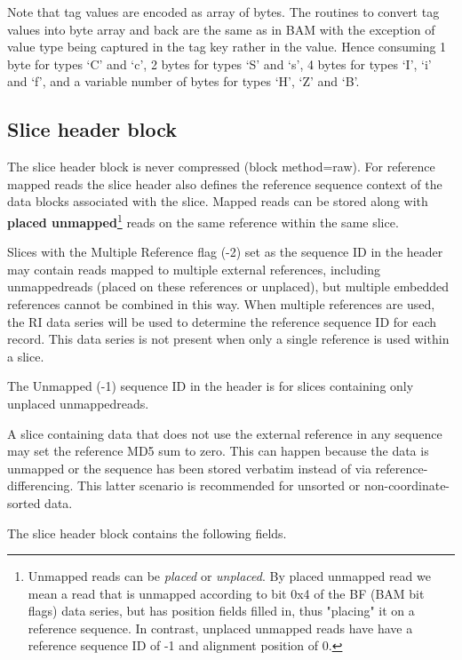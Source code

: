 \documentclass[a4paper]{article}
\begin{document}
Note that tag values are encoded as array of bytes. The routines to convert tag 
values into byte array and back are the same as in BAM with the exception of value 
type being captured in the tag key rather in the value.
Hence consuming 1 byte for types `C' and `c', 2 bytes for types `S' and `s', 4 bytes for types `I', `i' and `f', and a variable number of bytes for types `H', `Z' and `B'.

\subsection{\textbf{Slice header block}}

The slice header block is never compressed (block method=raw). For reference mapped 
reads the slice header also defines the reference sequence context of the data 
blocks associated with the slice. Mapped reads can be stored along with
\textbf{placed unmapped}\footnote{Unmapped reads can be \textit{placed} or \textit{unplaced}.
By placed unmapped read we mean a read that is unmapped according to bit 0x4 of the
BF (BAM bit flags) data series, but has position fields filled in, thus "placing"  it on a reference sequence. In contrast,
unplaced unmapped reads have have a reference sequence ID of -1 and alignment position of 0.}
reads on the same reference within the same slice.

Slices with the Multiple Reference flag (-2) set as the sequence ID in the header may contain reads
mapped to multiple external references, including unmapped\footnotemark[\value{footnote}] reads (placed on these references or unplaced),
but multiple embedded references cannot be combined in this way.  When multiple references are
used, the RI data series will be used to determine the reference sequence ID for each record.  This
data series is not present when only a single reference is used within a slice.

The Unmapped (-1) sequence ID in the header is for slices containing only unplaced
unmapped\footnotemark[\value{footnote}] reads.

A slice containing data that does not use the external reference in
any sequence may set the reference MD5 sum to zero.  This can happen
because the data is unmapped or the sequence has been stored verbatim
instead of via reference-differencing.  This latter scenario is
recommended for unsorted or non-coordinate-sorted data.

The slice header block contains the following fields.
\end{document}

